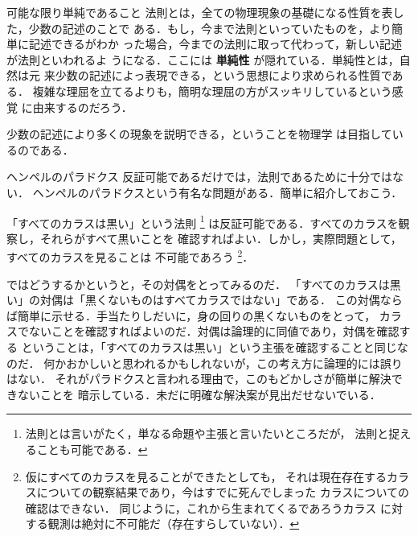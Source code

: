             \begin{mysmallsec}{可能な限り単純であること}
            法則とは，全ての物理現象の基礎になる性質を表した，少数の記述のことで
            ある．もし，今まで法則といっていたものを，より簡単に記述できるがわか
            った場合，今までの法則に取って代わって，新しい記述が法則といわれるよ
            うになる．ここには \textbf{単純性} が隠れている．単純性とは，自然は元
            来少数の記述によっ表現できる，という思想により求められる性質である．
            複雑な理屈を立てるよりも，簡明な理屈の方がスッキリしているという感覚
            に由来するのだろう．

            少数の記述により多くの現象を説明できる，ということを物理学
            は目指しているのである．
            \end{mysmallsec}

            \begin{memo}{ヘンペルのパラドクス}
            反証可能であるだけでは，法則であるために十分ではない．
            ヘンペルのパラドクスという有名な問題がある．簡単に紹介しておこう．

            「すべてのカラスは黒い」という法則
                \footnote{
                    法則とは言いがたく，単なる命題や主張と言いたいところだが，
                    法則と捉えることも可能である．
                }
            は反証可能である．すべてのカラスを観察し，それらがすべて黒いことを
            確認すればよい．しかし，実際問題として，すべてのカラスを見ることは
            不可能であろう
                \footnote{
                    仮にすべてのカラスを見ることができたとしても，
                    それは現在存在するカラスについての観察結果であり，今はすでに死んでしまった
                    カラスについての確認はできない．
                    同じように，これから生まれてくるであろうカラス
                    に対する観測は絶対に不可能だ（存在すらしていない）．
                }．

            ではどうするかというと，その対偶をとってみるのだ．
            「すべてのカラスは黒い」の対偶は「黒くないものはすべてカラスではない」である．
            この対偶ならば簡単に示せる．手当たりしだいに，身の回りの黒くないものをとって，
            カラスでないことを確認すればよいのだ．対偶は論理的に同値であり，対偶を確認する
            ということは，「すべてのカラスは黒い」という主張を確認することと同じなのだ．
            何かおかしいと思われるかもしれないが，この考え方に論理的には誤りはない．
            それがパラドクスと言われる理由で，このもどかしさが簡単に解決できないことを
            暗示している．未だに明確な解決案が見出だせないでいる．
            \end{memo}


